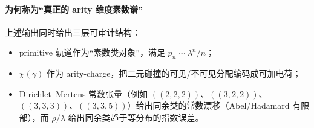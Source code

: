 \paragraph{为何称为“真正的 arity 维度素数谱”}
上述输出同时给出三层可审计结构：
\begin{itemize}
  \item primitive 轨道作为“素数类对象”，满足 $p_n\sim \lambda^n/n$；
\item $\chi(\gamma)$ 作为 arity-charge，把二元碰撞的可见/不可见分配编码成可加电荷；
  \item Dirichlet--Mertens 常数张量（例如 \(((2,2,2))\)、\(((3,2,2))\)、\(((3,3,3))\)、\(((3,3,5))\)）给出同余类的常数漂移（Abel/Hadamard 有限部），而 $\rho/\lambda$ 给出同余类趋于等分布的指数误差。
\end{itemize}
